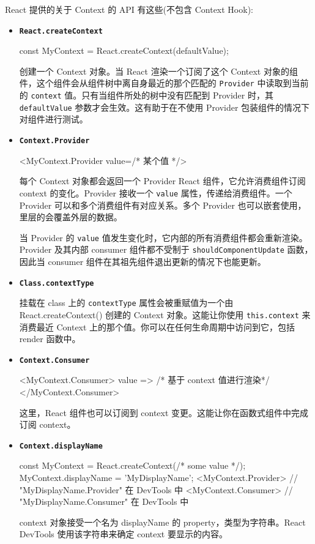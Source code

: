 React 提供的关于 Context 的 API 有这些(不包含 Context Hook):
\begin{itemize}
  \item \textbf{\texttt{React.createContext}}
  
\begin{JavaScript}
  const MyContext = React.createContext(defaultValue);
\end{JavaScript}
  
  创建一个 Context 对象。当 React 渲染一个订阅了这个 Context 对象的组件，这个组件会从组件树中离自身最近的那个匹配的 \texttt{Provider} 中读取到当前的 \texttt{context} 值。只有当组件所处的树中没有匹配到 Provider 时，其 \texttt{defaultValue} 参数才会生效。这有助于在不使用 Provider 包装组件的情况下对组件进行测试。

  \item \textbf{\texttt{Context.Provider}}

\begin{HTML}
<MyContext.Provider value={/* 某个值 */}>
\end{HTML}

每个 Context 对象都会返回一个 Provider React 组件，它允许消费组件订阅 context 的变化。Provider 接收一个 \texttt{value} 属性，传递给消费组件。一个 Provider 可以和多个消费组件有对应关系。多个 Provider 也可以嵌套使用，里层的会覆盖外层的数据。

当 Provider 的 \texttt{value} 值发生变化时，它内部的所有消费组件都会重新渲染。Provider 及其内部 consumer 组件都不受制于 \texttt{shouldComponentUpdate} 函数，因此当 consumer 组件在其祖先组件退出更新的情况下也能更新。

  \item \textbf{\texttt{Class.contextType}}
  
  挂载在 class 上的 \texttt{contextType} 属性会被重赋值为一个由 React.createContext() 创建的 Context 对象。这能让你使用 \texttt{this.context} 来消费最近 Context 上的那个值。你可以在任何生命周期中访问到它，包括 render 函数中。

  \item \textbf{\texttt{Context.Consumer}}
  
\begin{HTML}
<MyContext.Consumer>
  {value => /* 基于 context 值进行渲染*/}
</MyContext.Consumer>
\end{HTML}

  这里，React 组件也可以订阅到 context 变更。这能让你在函数式组件中完成订阅 context。

  \item \textbf{\texttt{Context.displayName}}
  
\begin{HTML}
const MyContext = React.createContext(/* some value */);
MyContext.displayName = 'MyDisplayName';
<MyContext.Provider> // "MyDisplayName.Provider" 在 DevTools 中
<MyContext.Consumer> // "MyDisplayName.Consumer" 在 DevTools 中
\end{HTML}

  context 对象接受一个名为 displayName 的 property，类型为字符串。React DevTools 使用该字符串来确定 context 要显示的内容。
\end{itemize}

